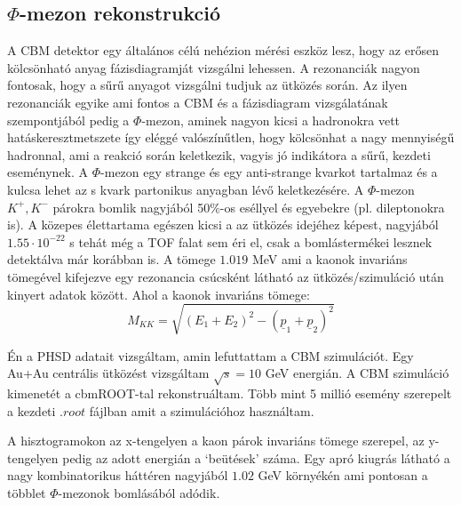 \documentclass[a4paper,12pt]{article}
\begin{document}
\subsection{ $\Phi$-mezon rekonstrukció}
\vspace{5mm}
\par A CBM detektor egy általános célú nehézion mérési eszköz lesz, hogy az erősen kölcsönható anyag fázisdiagramját vizsgálni lehessen. A
rezonanciák nagyon fontosak, hogy a sűrű anyagot vizsgálni tudjuk az ütközés során. Az ilyen rezonanciák egyike ami fontos a CBM és a 
fázisdiagram vizsgálatának szempontjából pedig a $\Phi$-mezon, aminek nagyon kicsi a hadronokra vett hatáskeresztmetszete így eléggé 
valószínűtlen, hogy kölcsönhat a nagy mennyiségű hadronnal, ami a reakció során keletkezik, vagyis jó indikátora a sűrű, kezdeti eseménynek.
A $\Phi$-mezon egy strange és egy anti-strange kvarkot tartalmaz és a kulcsa lehet az s kvark partonikus anyagban lévő keletkezésére. A
$\Phi$-mezon $K^{+}, K^{-}$ párokra bomlik nagyjából 50$\%$-os eséllyel és egyebekre (pl. dileptonokra is). A közepes élettartama egészen
kicsi a az ütközés idejéhez képest, nagyjából $1.55\cdot10^{-22}$ s tehát még a TOF falat sem éri el, csak a bomlástermékei lesznek detektálva már korábban is. 
A tömege $1.019$ MeV ami a kaonok invariáns tömegével kifejezve egy rezonancia csúcsként látható az ütközés/szimuláció után kinyert 
adatok között. Ahol a kaonok invariáns tömege:
\begin{equation*}
M_{KK} = \sqrt{(E_{1}+E_{2})^{2} - (\underline{p}_{1} + \underline{p}_{2})^{2}}
\end{equation*}
\vspace{5mm}
\par Én a PHSD adatait vizsgáltam, amin lefuttattam a CBM szimulációt. Egy Au+Au centrális ütközést vizsgáltam $\sqrt{s} = 10$ GeV energián. 
A CBM szimuláció kimenetét a cbmROOT-tal rekonstruáltam. Több mint 5 millió esemény szerepelt a kezdeti $.root$ fájlban amit a szimulációhoz 
használtam.
\vspace{5mm}
\par A hisztogramokon az x-tengelyen a kaon párok invariáns tömege szerepel, az y-tengelyen pedig az adott energián a `beütések' száma. Egy 
apró kiugrás látható a nagy kombinatorikus háttéren nagyjából $1.02$ GeV környékén ami pontosan a többlet $\Phi$-mezonok bomlásából adódik.
\end{document}
